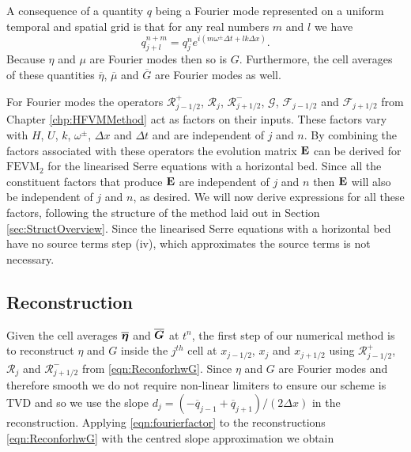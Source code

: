 A consequence of a quantity $q$ being a Fourier mode represented on a uniform temporal and spatial grid is that for any real numbers $m$ and $l$ we have
\begin{equation}
q^{n + m}_{j + l} = q^n_j e^{ i \left(m \omega^\pm \Delta t + l k \Delta x\right)}.
\label{eqn:fourierfactor}
\end{equation}
Because $\eta$ and $\mu$ are Fourier modes then so is $G$. Furthermore, the cell averages of these quantities $\overline{\eta}$, $\overline{\mu}$ and $\overline{G}$ are Fourier modes as well.

For Fourier modes the operators $\mathcal{R}^+_{j-1/2}$, $\mathcal{R}_{j}$, $\mathcal{R}^-_{j+1/2}$, $\mathcal{G}$, $\mathcal{F}_{j-1/2}$ and $\mathcal{F}_{j+1/2}$ from Chapter \ref{chp:HFVMMethod} act as factors on their inputs. These factors vary with $H$, $U$, $k$, $\omega^\pm$, $\Delta x$ and $\Delta t$ and are independent of $j$ and $n$. By combining the factors associated with these operators the evolution matrix $\mathbf{E}$ can be derived for $\text{FEVM}_2$ for the linearised Serre equations with a horizontal bed. Since all the constituent factors that produce $\mathbf{E}$ are independent of $j$ and $n$ then $\mathbf{E}$ will also be independent of $j$ and $n$, as desired. We will now derive expressions for all these factors, following the structure of the method laid out in Section \ref{sec:StructOverview}. Since the linearised Serre equations with a horizontal bed have no source terms step (iv), which approximates the source terms is not necessary. 

\subsection{Reconstruction}
Given the cell averages $\overline{\boldsymbol{\eta}}$ and $\overline{\boldsymbol{G}}$ at $t^n$, the first step of our numerical method is to reconstruct $\eta$ and $G$ inside the $j^{th}$ cell at $x_{j-1/2}$, $x_j$ and $x_{j+1/2}$ using $\mathcal{R}^+_{j-1/2}$, $\mathcal{R}_{j}$ and $\mathcal{R}^-_{j+1/2}$ from \eqref{eqn:ReconforhwG}. Since $\eta$ and $G$ are Fourier modes and therefore smooth we do not require non-linear limiters to ensure our scheme is TVD and so we use the slope $d_j = \left({-\overline{q}_{j-1} +\overline{q}_{j+1}}\right)/ \left({2\Delta x} \right)$ in the reconstruction. Applying \eqref{eqn:fourierfactor} to the reconstructions \eqref{eqn:ReconforhwG} with the centred slope approximation we obtain 

